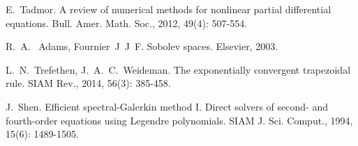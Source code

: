 \documentclass[12pt,en]{homework}
\begin{document}

\clearpage
\begin{thebibliography}{99}
 E.~Tadmor. A review of numerical methods for nonlinear partial differential equations. Bull. Amer. Math. Soc., 2012, 49(4): 507-554.

 R.~A.~ Adams, Fournier~J~J~F. Sobolev spaces. Elsevier, 2003.

 L.~N.~Trefethen, J.~A.~C.~Weideman. The exponentially convergent trapezoidal rule. SIAM Rev., 2014, 56(3): 385-458.

 J.~Shen. Efficient spectral-Galerkin method I. Direct solvers of second- and fourth-order equations using Legendre polynomials. SIAM J. Sci. Comput., 1994, 15(6): 1489-1505.

\end{thebibliography}
\end{document}
